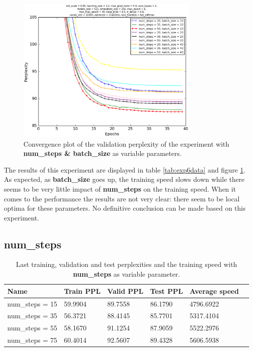 \documentclass[10pt,a4paper,titlepage]{article}
\begin{document}
\begin{figure}[H]
	\begin{center}
		\includegraphics[width=0.80\textwidth]{Figures/numstepsbatchperf.eps}
		\caption{Convergence plot of the validation perplexity of the experiment with \textbf{num\_steps \& batch\_size} as variable parameters. }
		\label{fig:exp6perf}
	\end{center}	
\end{figure}

The results of this experiment are displayed in table \ref{tab:exp6data} and figure \ref{fig:exp6perf}. As expected,  as \textbf{batch\_size} goes up, the training speed slows down while there seems to be very little impact of \textbf{num\_steps} on the training speed. When it comes to the performance the results are not very clear: there seem to be local optima for these parameters. No definitive conclusion can be made based on this experiment.

\newpage

\subsection{num\_steps}

\begin{table}[H]
\centering
\caption{Last training, validation and test perplexities and the training speed with \textbf{num\_steps} as variable parameter.}
\label{tab:exp7data}
\begin{tabular}{|l|l|l|l|l|l|}
\hline
{\small Name} & {\small Train PPL} & {\small Valid PPL} & {\small Test PPL} & {\small Average speed}\\ \hline
{\small num\_steps = 15}                                & 59.9904    & 89.7558    & 86.1790    & 4796.6922  \\ \hline
{\small num\_steps = 35}                                & 56.3721    & 88.4145    & 85.7701    & 5317.4104  \\ \hline
{\small num\_steps = 55}                                & 58.1670    & 91.1254    & 87.9059    & 5522.2976  \\ \hline
{\small num\_steps = 75}                                & 60.4014    & 92.5607    & 89.4328    & 5606.5938  \\ \hline
\end{tabular}
\end{table}
\end{document}
